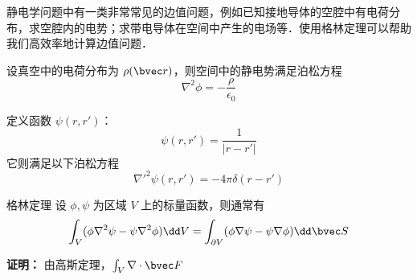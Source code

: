 

静电学问题中有一类非常常见的边值问题，例如已知接地导体的空腔中有电荷分布，求空腔内的电势；求带电导体在空间中产生的电场等．使用格林定理可以帮助我们高效率地计算边值问题．

设真空中的电荷分布为 $\rho(\bvec r)$，则空间中的静电势满足泊松方程
\begin{equation}
\nabla^2 \phi = -\frac{\rho}{\epsilon_0}
\end{equation}

定义函数 $\psi(r,r')$：
\begin{equation}
\psi(r,r')=\frac{1}{|r-r'|}
\end{equation}
它则满足以下泊松方程
\begin{equation}
\nabla'^2 \psi(r,r')=-4\pi\delta(r-r')
\end{equation}

\begin{theorem}{格林定理}
设 $\phi,\psi$ 为区域 $V$ 上的标量函数，则通常有
\begin{equation}
\int_V (\phi \nabla^2 \psi -\psi\nabla^2\phi)\dd V=\int_{\partial V}(\phi \nabla \psi-\psi\nabla\phi){\dd \bvec S} 
\end{equation}
\end{theorem}
\textbf{证明：} 由高斯定理，$\int_V \nabla\cdot \bvec F$
\begin{equation}

\end{equation}
